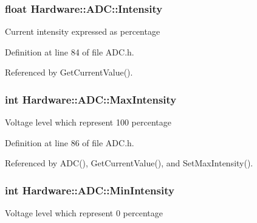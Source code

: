 \hypertarget{class_hardware_1_1_a_d_c_a38a0f00558a3de01b3bce567643dae4a}{}
\subsubsection[{Intensity}]{\setlength{\rightskip}{0pt plus 5cm}float Hardware\+::\+A\+D\+C\+::\+Intensity\hspace{0.3cm}{\ttfamily [private]}}\label{class_hardware_1_1_a_d_c_a38a0f00558a3de01b3bce567643dae4a}
Current intensity expressed as percentage 

Definition at line 84 of file A\+D\+C.\+h.



Referenced by Get\+Current\+Value().

\hypertarget{class_hardware_1_1_a_d_c_a8fb4ac4b41ff54a44e57e9ce8bc5bd93}{}
\subsubsection[{Max\+Intensity}]{\setlength{\rightskip}{0pt plus 5cm}int Hardware\+::\+A\+D\+C\+::\+Max\+Intensity\hspace{0.3cm}{\ttfamily [private]}}\label{class_hardware_1_1_a_d_c_a8fb4ac4b41ff54a44e57e9ce8bc5bd93}
Voltage level which represent 100 percentage 

Definition at line 86 of file A\+D\+C.\+h.



Referenced by A\+D\+C(), Get\+Current\+Value(), and Set\+Max\+Intensity().

\hypertarget{class_hardware_1_1_a_d_c_af73224014dddfdd80f77b80e6ed82c13}{}
\subsubsection[{Min\+Intensity}]{\setlength{\rightskip}{0pt plus 5cm}int Hardware\+::\+A\+D\+C\+::\+Min\+Intensity\hspace{0.3cm}{\ttfamily [private]}}\label{class_hardware_1_1_a_d_c_af73224014dddfdd80f77b80e6ed82c13}
Voltage level which represent 0 percentage 

